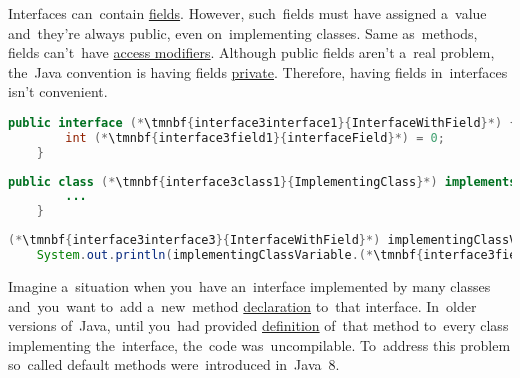 \noindent Interfaces can~contain \hyperref[variablefieldproperty]{fields}.
However, such~fields must have assigned a~value and~they're always public, even on~implementing classes.
Same as~methods, fields can't~have \hyperref[javaaccessmodofiers]{access modifiers}.
Although public fields aren't a~real problem, the~Java convention is having fields \hyperref[javaprivate]{private}.
Therefore, having fields in~interfaces isn't convenient.

\enlargethispage{20mm}
\thispagestyle{empty}
\begin{lstlisting}[language=Java, title={Interface with field}]
    public interface (*\tmnbf{interface3interface1}{InterfaceWithField}*) {
        int (*\tmnbf{interface3field1}{interfaceField}*) = 0;
    }
\end{lstlisting}
\begin{lstlisting}[language=Java, title={Implementing class}]
    public class (*\tmnbf{interface3class1}{ImplementingClass}*) implements (*\tmnbf{interface3interface2}{InterfaceWithField}*) {
        ...
    }
\end{lstlisting}
\begin{lstlisting}[language=Java, title={Usage}]
    (*\tmnbf{interface3interface3}{InterfaceWithField}*) implementingClassVariable = new (*\tmnbf{interface3class2}{ImplementingClass}*)();
    System.out.println(implementingClassVariable.(*\tmnbf{interface3field2}{interfaceField}*));
\end{lstlisting}
\newpage

Imagine a~situation when you~have an~interface implemented by many classes and~you~want to~add a~new~method \hyperref[declarationdefinition]{declaration} to~that interface.
In~older versions of~Java, until you~had provided \hyperref[declarationdefinition]{definition} of~that method to~every class implementing the~interface, the~code was~uncompilable.
To~address this problem so~called default methods were~introduced in~Java~8.

